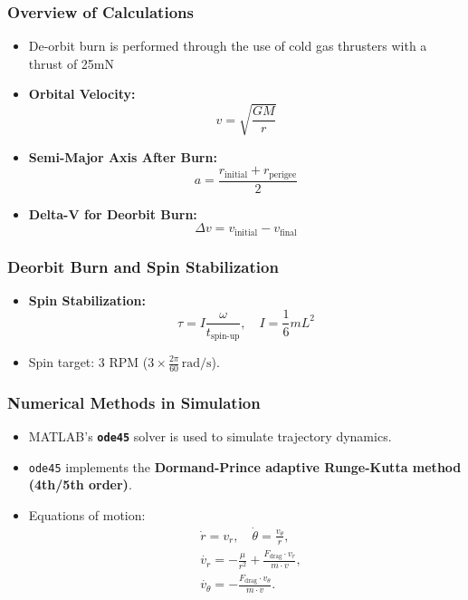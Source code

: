 \documentclass{beamer}
\begin{document}
\begin{frame}
    \frametitle{Overview of Calculations}
    \begin{itemize}
        \item De-orbit burn is performed through the use of cold gas thrusters with a thrust of 25mN
        \item \textbf{Orbital Velocity:}
\[
v = \sqrt{\frac{G M}{r}}
\]

        \item \textbf{Semi-Major Axis After Burn:}
        \[
        a = \frac{r_{\text{initial}} + r_{\text{perigee}}}{2}
        \]
        \item \textbf{Delta-V for Deorbit Burn:}
        \[
        \Delta v = v_{\text{initial}} - v_{\text{final}}
        \]
    \end{itemize}
\end{frame}

\begin{frame}
    \frametitle{Deorbit Burn and Spin Stabilization}
    \begin{itemize}
        \item \textbf{Spin Stabilization:}
        \[
        \tau = I \frac{\omega}{t_{\text{spin-up}}}, \quad I = \frac{1}{6} m L^2
        \]
        \item Spin target: 3 RPM (\( 3 \times \frac{2\pi}{60} \, \mathrm{rad/s} \)).
    \end{itemize}
\end{frame}


\begin{frame}
    \frametitle{Numerical Methods in Simulation}
    \begin{itemize}
        \item MATLAB's \textbf{\texttt{ode45}} solver is used to simulate trajectory dynamics.
        \item \texttt{ode45} implements the \textbf{Dormand-Prince adaptive Runge-Kutta method (4th/5th order)}.
        \item Equations of motion:
        \[
        \begin{aligned}
        &\dot{r} = v_r, \quad \dot{\theta} = \frac{v_\theta}{r}, \\
        &\dot{v_r} = -\frac{\mu}{r^2} + \frac{F_{\text{drag}} \cdot v_r}{m \cdot v}, \\
        &\dot{v_\theta} = -\frac{F_{\text{drag}} \cdot v_\theta}{m \cdot v}.
        \end{aligned}
        \]
    \end{itemize}
\end{frame}
\end{document}
